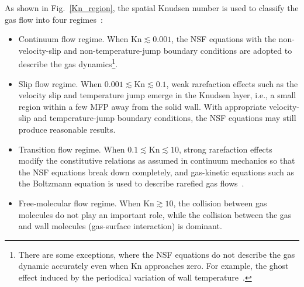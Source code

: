 As shown in Fig.~\ref{Kn_region}, the spatial Knudsen number is used to classify the gas flow into four regimes~\cite{Qian1946,Gad-el-Hak1999}: 
\begin{itemize}
	\item Continuum flow regime.  When $\text{Kn}\lesssim0.001$, the NSF equations with the non-velocity-slip and non-temperature-jump boundary conditions are adopted to describe the gas dynamics\footnote{There are some exceptions, where the NSF equations do not describe the gas dynamic accurately even when $\text{Kn}$ approaches zero. For example, the ghost effect induced by the periodical variation of wall temperature~\cite{Sone2002Book}.}. 
	
	\item Slip flow regime.   When $0.001\lesssim{}\text{Kn}\lesssim0.1$,  weak rarefaction effects such as the velocity slip and temperature jump emerge in the Knudsen layer, i.e., a small region within a few MFP away from the solid wall. With appropriate velocity-slip and temperature-jump boundary conditions, the NSF equations may still produce reasonable results. 
	
	\item  Transition flow regime.  When $0.1\lesssim{}\text{Kn}\lesssim10$, strong rarefaction effects modify the constitutive relations as assumed in continuum mechanics so that the NSF equations break down completely, and gas-kinetic equations such as the Boltzmann equation is used to describe rarefied gas flows~\citep{CE}. 
	
	\item Free-molecular flow regime.  When $\text{Kn}\gtrsim10$, the collision between gas molecules do not play an important role, while the collision between the gas and wall molecules (gas-surface interaction) is dominant.
	
\end{itemize}

